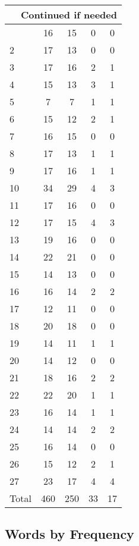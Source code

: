 \begin{center}
\begin{longtable}{l|c|c|c|c}
\hline \multicolumn{5}{|r|}{{Continued if needed}} \\ \hline
\endfoot 
1 & 16 & 15 & 0 & 0\\ \hline
2 & 17 & 13 & 0 & 0\\ \hline
3 & 17 & 16 & 2 & 1\\ \hline
4 & 15 & 13 & 3 & 1\\ \hline
5 & 7 & 7 & 1 & 1\\ \hline
6 & 15 & 12 & 2 & 1\\ \hline
7 & 16 & 15 & 0 & 0\\ \hline
8 & 17 & 13 & 1 & 1\\ \hline
9 & 17 & 16 & 1 & 1\\ \hline
10 & 34 & 29 & 4 & 3\\ \hline
11 & 17 & 16 & 0 & 0\\ \hline
12 & 17 & 15 & 4 & 3\\ \hline
13 & 19 & 16 & 0 & 0\\ \hline
14 & 22 & 21 & 0 & 0\\ \hline
15 & 14 & 13 & 0 & 0\\ \hline
16 & 16 & 14 & 2 & 2\\ \hline
17 & 12 & 11 & 0 & 0\\ \hline
18 & 20 & 18 & 0 & 0\\ \hline
19 & 14 & 11 & 1 & 1\\ \hline
20 & 14 & 12 & 0 & 0\\ \hline
21 & 18 & 16 & 2 & 2\\ \hline
22 & 22 & 20 & 1 & 1\\ \hline
23 & 16 & 14 & 1 & 1\\ \hline
24 & 14 & 14 & 2 & 2\\ \hline
25 & 16 & 14 & 0 & 0\\ \hline
26 & 15 & 12 & 2 & 1\\ \hline
27 & 23 & 17 & 4 & 4\\ \hline
\hline \hline
Total & 460 & 250 & 33 & 17




\end{longtable}
\end{center}



\subsection{Words by Frequency}

